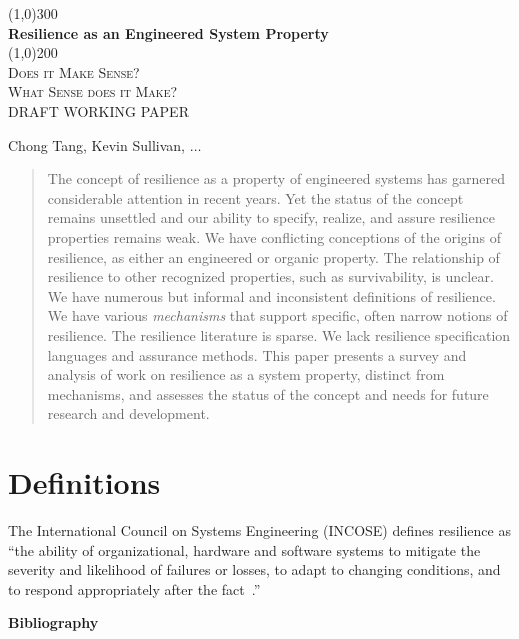 \documentclass[11pt]{article}
\begin{document}
\begin{titlepage}
  \begin{center}
    \line(1,0){300} \\
    [0.25in]
    \huge{\bfseries Resilience as an Engineered System Property} \\
    [2mm]
    \line(1,0){200} \\
    [1.5cm]
    \textsc{\LARGE Does it Make Sense? \\ What Sense does it Make?} \\
    [3cm]
    DRAFT WORKING PAPER \\
    [6.0cm]
  \end{center}
  \begin{flushright}
    Chong Tang, Kevin Sullivan, $\ldots$\\
  \end{flushright}
\end{titlepage}


\begin{abstract}
  The concept of resilience as a property of engineered systems has
  garnered considerable attention in recent years. Yet the status of
  the concept remains unsettled and our ability to specify, realize,
  and assure resilience properties remains weak.  We have conflicting
  conceptions of the origins of resilience, as either an engineered or
  organic property. The relationship of resilience to other recognized
  properties, such as survivability, is unclear. We have numerous but
  informal and inconsistent definitions of resilience. We have various
  {\it mechanisms\/} that support specific, often narrow notions of
  resilience. The resilience literature is sparse. We lack resilience
  specification languages and assurance methods.  This paper presents
  a survey and analysis of work on resilience as a system property,
  distinct from mechanisms, and assesses the status of the concept and
  needs for future research and development.
\end{abstract}


\section{Definitions}

The International Council on Systems Engineering (INCOSE) defines resilience as ``the ability of organizational, hardware and software systems to mitigate the severity and likelihood of failures or losses, to adapt to changing conditions, and to respond appropriately after the fact~\cite{incose}.''


\begin{center}
  {\Large \bf Bibliography}
\end{center}

\nocite{*}
 
\end{document}
